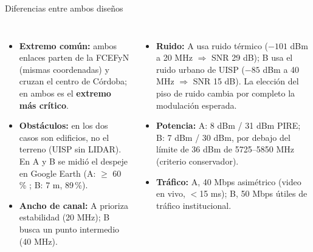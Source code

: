 \begin{frame}{Diferencias entre ambos diseños}
  \small
  \begin{columns}[T]
    \begin{itemize}
      \item \textbf{Extremo común:} ambos enlaces parten de la FCEFyN (mismas coordenadas) y
            cruzan el centro de Córdoba; en ambos es el \textbf{extremo más crítico}.
      \item \textbf{Obstáculos:} en los dos casos son edificios, no el terreno (UISP sin LIDAR).
            En A y B se midió el despeje en Google Earth (A: $\ge$ 60\,\% ; B: 7 m, 89\,\%).
      \item \textbf{Ancho de canal:} A prioriza estabilidad (20 MHz); B busca un punto
            intermedio (40 MHz).
    \end{itemize}
    \begin{itemize}
      \item \textbf{Ruido:} A usa ruido térmico ($-101$ dBm a 20 MHz $\Rightarrow$ SNR 29 dB);
            B usa el ruido urbano de UISP ($-85$ dBm a 40 MHz $\Rightarrow$ SNR 15 dB). La
            elección del piso de ruido cambia por completo la modulación esperada.
      \item \textbf{Potencia:} A: 8 dBm / 31 dBm PIRE; B: 7 dBm / 30 dBm, por debajo del
            límite de 36 dBm de 5725--5850 MHz (criterio conservador).
      \item \textbf{Tráfico:} A, 40 Mbps asimétrico (video en vivo, $<$15 ms);
            B, 50 Mbps útiles de tráfico institucional.
    \end{itemize}
  \end{columns}
\end{frame}
